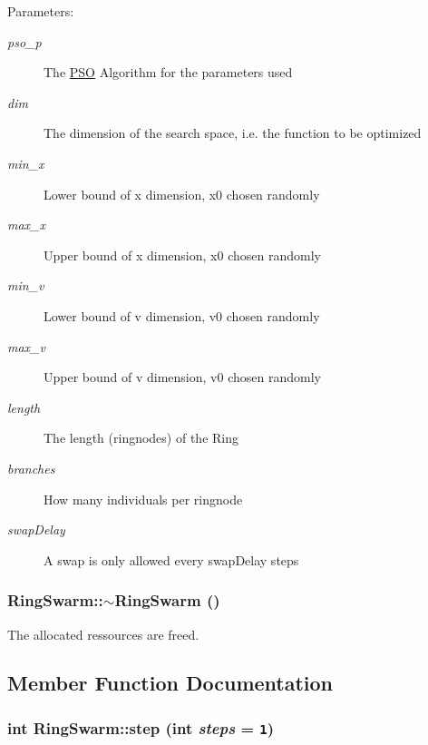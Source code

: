 \begin{Desc}
\item[Parameters: ]\par
\begin{description}
\item[{\em 
pso\_\-p}]The \hyperlink{classPSO}{PSO} Algorithm for the parameters used \item[{\em 
dim}]The dimension of the search space, i.e. the function to be optimized \item[{\em 
min\_\-x}]Lower bound of x dimension, x0 chosen randomly \item[{\em 
max\_\-x}]Upper bound of x dimension, x0 chosen randomly \item[{\em 
min\_\-v}]Lower bound of v dimension, v0 chosen randomly \item[{\em 
max\_\-v}]Upper bound of v dimension, v0 chosen randomly \item[{\em 
length}]The length (ringnodes) of the Ring \item[{\em 
branches}]How many individuals per ringnode \item[{\em 
swapDelay}]A swap is only allowed every swapDelay steps \end{description}
\end{Desc}
\hypertarget{classRingSwarm_f498eeaf52d1053a4817b39413b77a48}{
\subsubsection{\setlength{\rightskip}{0pt plus 5cm}RingSwarm::$\sim$RingSwarm ()}}
\label{classRingSwarm_f498eeaf52d1053a4817b39413b77a48}


The allocated ressources are freed. 



\subsection{Member Function Documentation}
\hypertarget{classRingSwarm_a5441ba339db7fc269f4784917189eab}{
\subsubsection{\setlength{\rightskip}{0pt plus 5cm}int RingSwarm::step (int {\em steps} = {\tt 1})}}
\label{classRingSwarm_a5441ba339db7fc269f4784917189eab}



